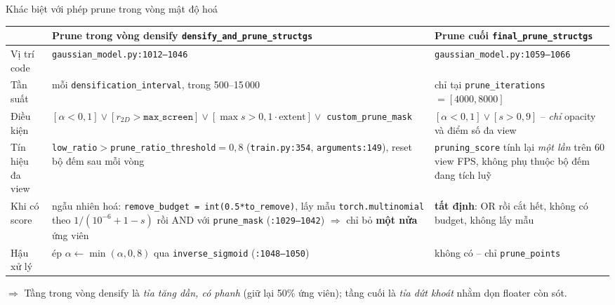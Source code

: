 \begin{frame}{Khác biệt với phép prune trong vòng mật độ hoá}
\scriptsize
\begin{table}
\centering
\begin{tabular}{p{2.4cm}p{4.4cm}p{4.4cm}}
\toprule
 & \textbf{Prune trong vòng densify} \newline \texttt{densify\_and\_prune\_structgs} & \textbf{Prune cuối} \newline \texttt{final\_prune\_structgs} \\
\midrule
Vị trí code & \texttt{gaussian\_model.py:1012--1046} & \texttt{gaussian\_model.py:1059--1066} \\
Tần suất & mỗi \texttt{densification\_interval}, trong 500--15\,000 & chỉ tại \texttt{prune\_iterations} $=[4000,8000]$ \\
Điều kiện & $[\alpha<0{,}1]\vee[r_{2D}>\texttt{max\_screen}]\vee[\max s>0{,}1\cdot\text{extent}]\vee$ \texttt{custom\_prune\_mask} & $[\alpha<0{,}1]\vee[s>0{,}9]$ -- \emph{chỉ} opacity và điểm số đa view \\
Tín hiệu đa view & \texttt{low\_ratio}$>$\texttt{prune\_ratio\_threshold}$=0{,}8$ (\texttt{train.py:354}, \texttt{arguments:149}), reset bộ đếm sau mỗi vòng & \texttt{pruning\_score} tính lại \emph{một lần} trên 60 view FPS, không phụ thuộc bộ đếm đang tích luỹ \\
Khi có score & \alert{ngẫu nhiên hoá}: \texttt{remove\_budget = int(0.5*to\_remove)}, lấy mẫu \texttt{torch.multinomial} theo $1/(10^{-6}+1-s)$ rồi AND với \texttt{prune\_mask} (\texttt{:1029--1042}) $\Rightarrow$ chỉ bỏ \textbf{một nửa} ứng viên & \textbf{tất định}: OR rồi cắt hết, không có budget, không lấy mẫu \\
Hậu xử lý & ép $\alpha \leftarrow \min(\alpha, 0{,}8)$ qua \texttt{inverse\_sigmoid} (\texttt{:1048--1050}) & không có -- chỉ \texttt{prune\_points} \\
\bottomrule
\end{tabular}
\end{table}
\footnotesize
$\Rightarrow$ Tầng trong vòng densify là \emph{tỉa tăng dần, có phanh} (giữ lại 50\% ứng viên); tầng cuối là \emph{tỉa dứt khoát} nhằm dọn floater còn sót.
\end{frame}

